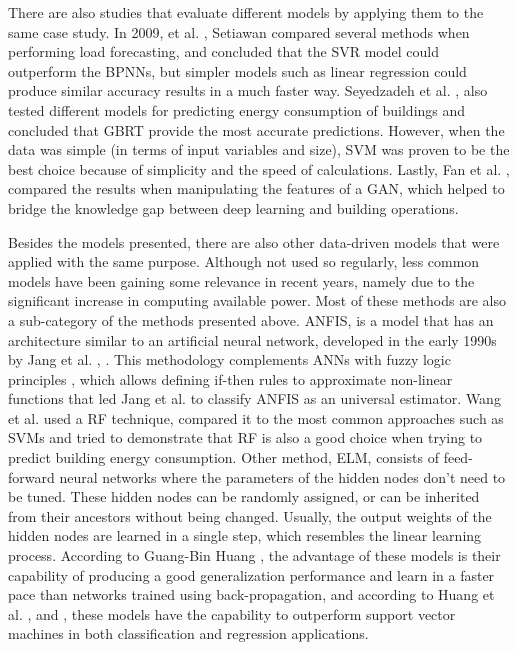 There are also studies that evaluate different models by applying them to the same case study. In 2009, et al. \cite{svmr0}, Setiawan compared several methods when performing load forecasting, and concluded that the \ac{SVR} model could outperform the \ac{BPNN}s, but simpler models such as linear regression could produce similar accuracy results in a much faster way. Seyedzadeh et al. \cite{other2}, also tested different models for predicting energy consumption of buildings and concluded that \ac{GBRT} provide the most accurate predictions. However, when the data was simple (in terms of input variables and size), \ac{SVM} was proven to be the best choice because of simplicity and the speed of calculations. Lastly, Fan et al. \cite{other1}, compared the results when manipulating the features of a \ac{GAN}, which helped to bridge the knowledge gap between deep learning and building operations. 

Besides the models presented, there are also other data-driven models that were applied with the same purpose. Although not used so regularly, less common models have been gaining some relevance in recent years, namely due to the significant increase in computing available power. Most of these methods are also a sub-category of the methods presented above. \ac{ANFIS}, is a model that has an architecture similar to an artificial neural network, developed in the early 1990s by Jang et al. \cite{anfis1}, \cite{anfis2}. This methodology complements \ac{ANN}s with fuzzy logic principles \cite{anfis3}, which allows defining if-then rules to approximate non-linear functions that led Jang et al. \cite{anfis4} to classify \ac{ANFIS} as an universal estimator. Wang et al. \cite{rf0} used a \ac{RF} technique, compared it to the most common approaches such as \ac{SVM}s and tried to demonstrate that RF is also a good choice when trying to predict building energy consumption. Other method, \ac{ELM}, consists of feed-forward neural networks where the parameters of the hidden nodes don't need to be tuned. These hidden nodes can be randomly assigned, or can be inherited from their ancestors without being changed. Usually, the output weights of the hidden nodes are learned in a single step, which resembles the linear learning process. According to Guang-Bin Huang \cite{elm1}, the advantage of these models is their capability of producing a good generalization performance and learn in a faster pace than networks trained using back-propagation, and according to Huang et al. \cite{elm2}, \cite{elm3} and \cite{elm4}, these models have the capability to outperform support vector machines in both classification and regression applications.

